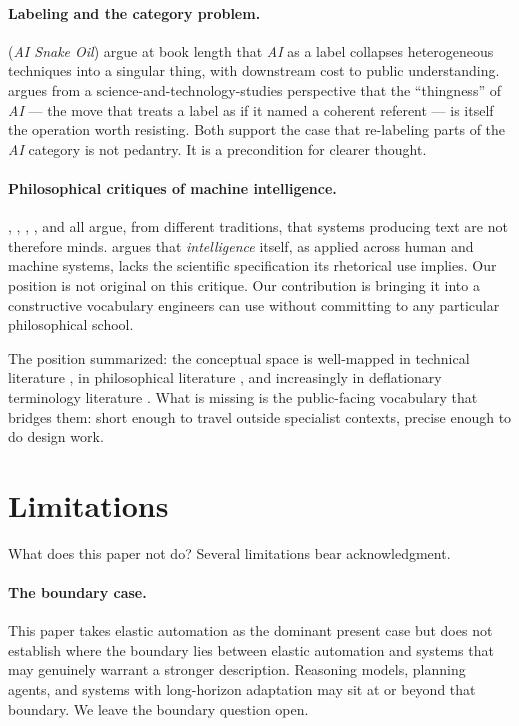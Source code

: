 \documentclass[11pt,a4paper]{article}
\begin{document}
\paragraph{Labeling and the category problem.} \citet{narayanankapoor2024snakeoil} (\textit{AI Snake Oil}) argue at book length that \textit{AI} as a label collapses heterogeneous techniques into a singular thing, with downstream cost to public understanding. \citet{suchman2023thingness} argues from a science-and-technology-studies perspective that the ``thingness'' of \textit{AI} --- the move that treats a label as if it named a coherent referent --- is itself the operation worth resisting. Both support the case that re-labeling parts of the \textit{AI} category is not pedantry. It is a precondition for clearer thought.

\paragraph{Philosophical critiques of machine intelligence.} \citet{searle1980minds}, \citet{dreyfus1972computers}, \citet{bender2021parrots}, \citet{marcus2022wall}, and \citet{mitchell2019ai,mitchell2024agi} all argue, from different traditions, that systems producing text are not therefore minds. \citet{mitchell2024agi} argues that \textit{intelligence} itself, as applied across human and machine systems, lacks the scientific specification its rhetorical use implies. Our position is not original on this critique. Our contribution is bringing it into a constructive vocabulary engineers can use without committing to any particular philosophical school.

The position summarized: the conceptual space is well-mapped in technical literature \citep{anthropic2024agents,zaharia2024compound}, in philosophical literature \citep{searle1980minds,dreyfus1972computers,bender2021parrots}, and increasingly in deflationary terminology literature \citep{shanahan2024talking,benderhanna2025aicon}. What is missing is the public-facing vocabulary that bridges them: short enough to travel outside specialist contexts, precise enough to do design work.

\section{Limitations}\label{sec:limitations}

What does this paper not do? Several limitations bear acknowledgment.

\paragraph{The boundary case.} This paper takes elastic automation as the dominant present case but does not establish where the boundary lies between elastic automation and systems that may genuinely warrant a stronger description. Reasoning models, planning agents, and systems with long-horizon adaptation may sit at or beyond that boundary. We leave the boundary question open.
\end{document}
